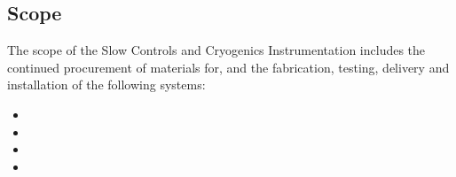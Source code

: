 \subsection{Scope}
\label{sec:fddp-slow-cryo-scope}

The scope of the Slow Controls and Cryogenics Instrumentation includes the continued procurement of materials for, and the fabrication, testing, delivery and installation of the following systems: 


\begin{itemize}
\item 
\item 
\item  
\item 
\end{itemize}


